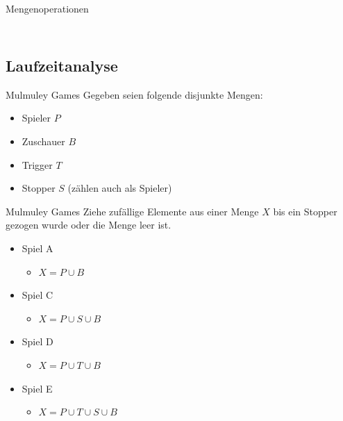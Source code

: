 \documentclass[t]{beamer}
\theoremstyle{plain}
\begin{document}
\begin{frame}{Mengenoperationen}
\begin{columns}
\begin{column}{.35\textwidth}
{        }
    \end{column}
    \end{columns}
\end{frame}

\subsection{Laufzeitanalyse}
\begin{frame}{Mulmuley Games}
    Gegeben seien folgende disjunkte Mengen:
    \begin{itemize}
        \item Spieler $P$
        \item Zuschauer $B$
        \item Trigger $T$
        \item Stopper $S$ (zählen auch als Spieler)
    \end{itemize}


\end{frame}
\begin{frame}{Mulmuley Games}
    Ziehe zufällige Elemente aus einer Menge $X$ bis ein Stopper gezogen wurde oder die Menge leer ist.
    \begin{itemize}
        \item Spiel A
        \begin{itemize}
            \item $X = P \cup B$
        \end{itemize}
        \item Spiel C
        \begin{itemize}
            \item $X = P \cup S \cup B$
        \end{itemize}
        \item Spiel D
        \begin{itemize}
            \item $X = P \cup T \cup B$
        \end{itemize}
        \item Spiel E
        \begin{itemize}
            \item $X = P \cup T \cup S \cup B$
        \end{itemize}
    \end{itemize}
\end{frame}
\end{document}
